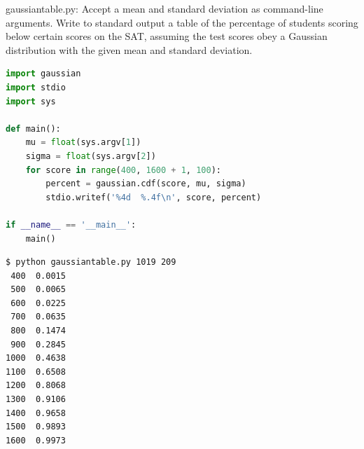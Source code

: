 \documentclass[8pt,a4paper,compress,handout]{beamer}
\begin{document}
\begin{frame}[fragile]
\begin{framed}
\tiny gaussiantable.py:  Accept a mean and standard deviation as command-line arguments. Write to standard output a table of the percentage of students scoring below certain scores on the SAT, assuming the test scores obey a Gaussian  distribution with the given mean and standard deviation.
\end{framed}

\begin{lstlisting}[language=Python]
import gaussian
import stdio
import sys

def main():
    mu = float(sys.argv[1])
    sigma = float(sys.argv[2])
    for score in range(400, 1600 + 1, 100):
        percent = gaussian.cdf(score, mu, sigma)
        stdio.writef('%4d  %.4f\n', score, percent)
 
if __name__ == '__main__':
    main()
\end{lstlisting}

\begin{lstlisting}[language={}]
$ python gaussiantable.py 1019 209
 400  0.0015
 500  0.0065
 600  0.0225
 700  0.0635
 800  0.1474
 900  0.2845
1000  0.4638
1100  0.6508
1200  0.8068
1300  0.9106
1400  0.9658
1500  0.9893
1600  0.9973
\end{lstlisting}
\end{frame}
\end{document}
